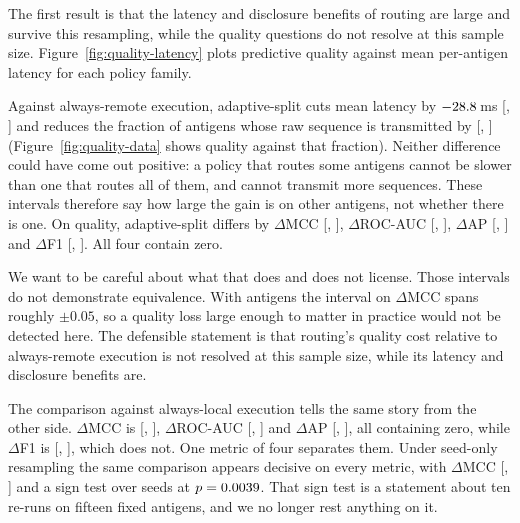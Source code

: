 The first result is that the latency and disclosure benefits of routing are
large and survive this resampling, while the quality questions do not resolve
at this sample size. Figure~\ref{fig:quality-latency} plots predictive quality
against mean
per-antigen latency for each policy family.

Against always-remote execution, adaptive-split cuts mean latency by
\(-28.8{}\,\)ms [\ADAsVsEoLatencyLo{}, \ADAsVsEoLatencyHi{}] and
reduces the fraction of antigens whose raw sequence is transmitted by
\ADAsVsEoRawShare{} [\ADAsVsEoRawShareLo{}, \ADAsVsEoRawShareHi{}]
(Figure~\ref{fig:quality-data} shows quality against that fraction). Neither
difference could have come out positive: a policy that routes some antigens
cannot be slower than one that routes all of them, and cannot transmit more
sequences. These intervals therefore say how large the gain is on other
antigens, not whether there is one. On quality, adaptive-split differs by
\(\Delta\)MCC \ADAsVsEoMcc{} [\ADAsVsEoMccLo{}, \ADAsVsEoMccHi{}],
\(\Delta\)ROC-AUC \ADAsVsEoAuc{} [\ADAsVsEoAucLo{}, \ADAsVsEoAucHi{}],
\(\Delta\)AP \ADAsVsEoAp{} [\ADAsVsEoApLo{}, \ADAsVsEoApHi{}] and \(\Delta\)F1
\ADAsVsEoFOne{} [\ADAsVsEoFOneLo{}, \ADAsVsEoFOneHi{}]. All four contain zero.

We want to be careful about what that does and does not license. Those
intervals do not demonstrate equivalence. With \AntigenCount{} antigens the interval on
\(\Delta\)MCC spans roughly \(\pm 0.05\), so a quality loss large enough to
matter in practice would not be detected here. The defensible statement is that
routing's quality cost relative to always-remote execution is not resolved at
this sample size, while its latency and disclosure benefits are.

The comparison against always-local execution tells the same story from the
other side. \(\Delta\)MCC is \ADAsVsLoMcc{}
[\ADAsVsLoMccLo{}, \ADAsVsLoMccHi{}], \(\Delta\)ROC-AUC \ADAsVsLoAuc{}
[\ADAsVsLoAucLo{}, \ADAsVsLoAucHi{}] and \(\Delta\)AP \ADAsVsLoAp{}
[\ADAsVsLoApLo{}, \ADAsVsLoApHi{}], all containing zero, while
\(\Delta\)F1 is \ADAsVsLoFOne{} [\ADAsVsLoFOneLo{}, \ADAsVsLoFOneHi{}], which
does not. One metric of four separates them. Under seed-only resampling the
same comparison appears decisive on every metric, with \(\Delta\)MCC
\DAsVsLoMcc{} [\DAsVsLoMccLo{}, \DAsVsLoMccHi{}] and a sign test over seeds at
\(p=0.0039{}\). That sign test is a statement about ten re-runs on fifteen
fixed antigens, and we no longer rest anything on it.

